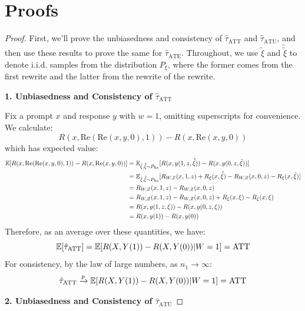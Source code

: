 \documentclass{article}
\begin{document}
\appendix

\section{Proofs}
\label{sec:proofs}
\mainthm*
\begin{proof}
  First, we'll prove the unbiasedness and consistency of $\hat{\tau}_{\text{ATT}}$ and $\hat{\tau}_{\text{ATU}}$, and then use these results to prove the same for $\hat{\tau}_{\text{ATE}}$. Throughout, we use $\tilde{\xi}$ and $\tilde{\tilde{\xi}}$ to denote i.i.d. samples from the distribution $P_\xi$, where the former comes from the first rewrite and the latter from the rewrite of the rewrite.
  
  \textbf{1. Unbiasedness and Consistency of $\hat{\tau}_{\text{ATT}}$}
  
  Fix a prompt $x$ and response $y$ with $w = 1$, omitting superscripts for convenience. We calculate:
  \[R(x, \text{Re}(\text{Re}(x, y, 0), 1)) - R(x, \text{Re}(x, y, 0))\]
  which has expected value:
  \begin{align*}
  \mathbb{E}[R(x, \text{Re}(\text{Re}(x, y, 0), 1)) - R(x, \text{Re}(x, y, 0))] &= \mathbb{E}_{\tilde{\xi}, \tilde{\tilde{\xi}} \sim P_{\text{Re}}}[R(x, y(1, z, \tilde{\tilde{\xi}})) - R(x, y(0, z, \tilde{\xi}))] \\
  &= \mathbb{E}_{\tilde{\xi}, \tilde{\tilde{\xi}} \sim P_{\text{Re}}}[R_{W,Z}(x, 1, z) + R_\xi(x, \tilde{\tilde{\xi}}) - R_{W,Z}(x, 0, z) - R_\xi(x, \tilde{\xi})] \\
  &= R_{W,Z}(x, 1, z) - R_{W,Z}(x, 0, z) \\
  &= R_{W,Z}(x, 1, z) - R_{W,Z}(x, 0, z) + R_\xi(x, \xi) - R_\xi(x, \xi) \\
  &= R(x, y(1, z, \xi)) - R(x, y(0, z, \xi)) \\
  &= R(x, y(1)) - R(x, y(0))
  \end{align*}
  Therefore, as an average over these quantities, we have:
  \[\mathbb{E}[\hat{\tau}_{\text{ATT}}] = \mathbb{E}[R(X, Y(1)) - R(X, Y(0)) | W = 1] = \text{ATT}\]
  For consistency, by the law of large numbers, as $n_1 \to \infty$:
  \[\hat{\tau}_{\text{ATT}} \xrightarrow{p} \mathbb{E}[R(X, Y(1)) - R(X, Y(0)) | W = 1] = \text{ATT}\]
  
  \textbf{2. Unbiasedness and Consistency of $\hat{\tau}_{\text{ATU}}$}
  

\end{proof}
\end{document}
